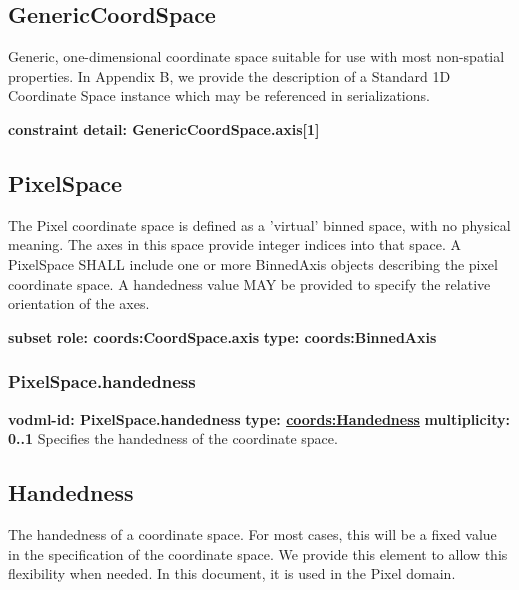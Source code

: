   \subsection{GenericCoordSpace}
  \label{sect:GenericCoordSpace}
    Generic, one-dimensional coordinate space suitable for use with most non-spatial properties. In Appendix B, we provide the description of a Standard 1D Coordinate Space instance which may be referenced in serializations.

    \noindent \textbf{constraint} \newline
    \indent    \textbf{detail: GenericCoordSpace.axis[1] }\newline


  \subsection{PixelSpace}
  \label{sect:PixelSpace}
  The Pixel coordinate space is defined as a 'virtual' binned space, with no physical meaning. The axes in this space provide integer indices into that space.  A PixelSpace SHALL include one or more BinnedAxis objects describing the pixel coordinate space. A handedness value MAY be provided to specify the relative orientation of the axes.

    \noindent \textbf{subset} \newline
    \indent   \textbf{role: coords:CoordSpace.axis} \newline
    \indent   \textbf{type: coords:BinnedAxis} \newline


    \subsubsection{PixelSpace.handedness}
      \textbf{vodml-id: PixelSpace.handedness} \newline
      \textbf{type: \hyperref[sect:Handedness]{coords:Handedness}} \newline
      \textbf{multiplicity: 0..1} \newline 
      Specifies the handedness of the coordinate space.


  \subsection{Handedness}
  \label{sect:Handedness}

  The handedness of a coordinate space. For most cases, this will be a fixed value in the specification of the coordinate space. We provide this element to allow this flexibility when needed. In this document, it is used in the Pixel domain.

